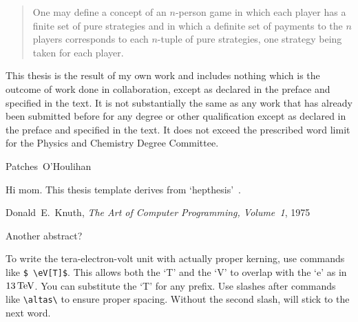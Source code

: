 
\begin{abstract}
One may define a concept of an $n$-person game in which each player has a
finite set of pure strategies and in which a definite set of payments to the
$n$ players corresponds to each $n$-tuple of pure strategies, one strategy
being taken for each player.
\end{abstract}


\begin{singlespacing}
\begin{declaration}
\noindent
This thesis is the result of my own work and includes nothing which is the
outcome of work done in collaboration, except as declared in the preface and
specified in the text.
%
It is not substantially the same as any work that has already been submitted
before for any degree or other qualification except as declared in the preface
and specified in the text.
%
It does not exceed the prescribed word limit for the
%
Physics and Chemistry
%
Degree Committee.
\vspace*{1cm}
\begin{flushright}
Patches~O'Houlihan
\end{flushright}
\end{declaration}
\end{singlespacing}


\begin{acknowledgements}
Hi mom.
This thesis template derives from `hepthesis'~\cite{hepthesis}.
\end{acknowledgements}


\begin{preface}
\begin{singlespacing}
\begin{epigraphs}
%
{Donald~E.~Knuth,
\textit{The Art of Computer Programming, Volume~1},
1975~\cite{knuth1975art}}
\end{epigraphs}
\end{singlespacing}
\noindent
Another abstract?

To write the tera-electron-volt unit with actually proper kerning, use commands
like \texttt{\$\,\textbackslash eV[T]\$}.
This allows both the `T' and the `V' to overlap with the `e' as in
$13\,\eV[T]$.
You can substitute the `T' for any prefix.
Use slashes after commands like \texttt{\textbackslash altas\textbackslash} to
ensure proper spacing.
Without the second slash, \atlas will stick to the next word.

\end{preface}

\tableofcontents

\thispagestyle{empty}
